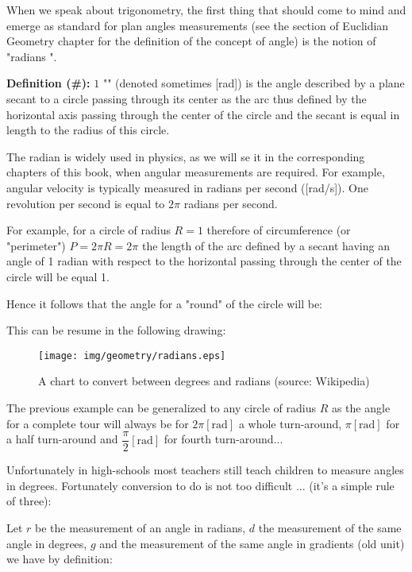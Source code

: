 	When we speak about trigonometry, the first thing that should come to mind and emerge as standard for plan angles measurements (see the section of Euclidian Geometry chapter for the definition of the concept of angle) is the notion of "radians ".

	\textbf{Definition (\#\mydef):} $1$ "" (denoted sometimes [rad]) is the angle described by a plane secant to a circle passing through its center as the arc thus defined by the horizontal axis passing through the center of the circle and the secant is equal in length to the radius of this circle.

	\begin{tcolorbox}[title=Remark,colframe=black,arc=10pt]
	The radian is widely used in physics, as we will se it in the corresponding chapters of this book, when angular measurements are required. For example, angular velocity is typically measured in radians per second ([rad/s]). One revolution per second is equal to $2\pi$ radians per second.
	\end{tcolorbox}
	
	For example, for a circle of radius $R=1$ therefore of circumference (or "perimeter") $P=2\pi R=2\pi$ the length of the arc defined by a secant having an angle of 1 radian with respect to the horizontal passing through the center of the circle will be equal 1.

	Hence it follows that the angle for a "round" of the circle will be:
	
	This can be resume in the following drawing:
	\begin{figure}[H]
		\centering
		\texttt{[image: img/geometry/radians.eps]}
		\caption[A chart to convert between degrees and radians]{A chart to convert between degrees and radians (source: Wikipedia)}
	\end{figure}
	The previous example can be generalized to any circle of radius $R$ as the angle for a complete tour will always be for $2\pi [\text{rad}]$ a whole turn-around, $\pi [\text{rad}]$  for a half turn-around and $\dfrac{\pi}{2} [\text{rad}]$ for fourth turn-around...
	
	Unfortunately in high-schools most teachers still teach children to measure angles in degrees. Fortunately conversion to do is not too difficult ... (it's a simple rule of three):
		
	Let $r$ be the measurement of an angle in radians, $d$ the measurement of the same angle in degrees, $g$ and the measurement of the same angle in gradients (old unit) we have by definition:
	
